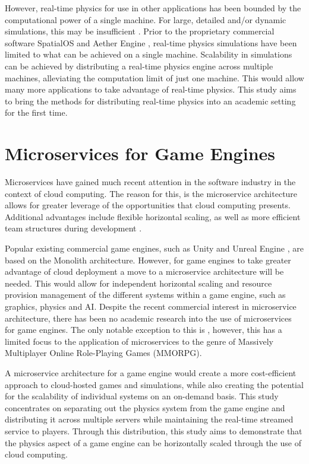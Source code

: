 
However, real-time physics for use in other applications has been bounded by the computational power of a single machine. For large, detailed and/or dynamic simulations, this may be insufficient \cite{koszela2018distributed}. Prior to the proprietary commercial software SpatialOS \cite{SpatialOS} and Aether Engine \cite{AetherEngine}, real-time physics simulations have been limited to what can be achieved on a single machine. Scalability in simulations can be achieved by distributing a real-time physics engine across multiple machines, alleviating the computation limit of just one machine. This would allow many more applications to take advantage of real-time physics. This study aims to bring the methods for distributing real-time physics into an academic setting for the first time.

\section{Microservices for Game Engines}
Microservices have gained much recent attention in the software industry in the context of cloud computing. The reason for this, is the microservice architecture allows for greater leverage of the opportunities that cloud computing presents. Additional advantages include flexible horizontal scaling, as well as more efficient team structures during development \cite{2017ExtractionofMicroservices}.

Popular existing commercial game engines, such as Unity \cite{Unity} and Unreal Engine \cite{Unreal}, are based on the Monolith architecture. However, for game engines to take greater advantage of cloud deployment a move to a microservice architecture will be needed. This would allow for independent horizontal scaling and resource provision management of the different systems within a game engine, such as graphics, physics and AI. Despite the recent commercial interest in microservice architecture, there has been no academic research into the use of microservices for game engines. The only notable exception to this is \cite{vaha2017applying}, however, this has a limited focus to the application of microservices to the genre of Massively Multiplayer Online Role-Playing Games (MMORPG).

A microservice architecture for a game engine would create a more cost-efficient approach to cloud-hosted games and simulations, while also creating the potential for the scalability of individual systems on an on-demand basis. This study concentrates on separating out the physics system from the game engine and distributing it across multiple servers while maintaining the real-time streamed service to players. Through this distribution, this study aims to demonstrate that the physics aspect of a game engine can be horizontally scaled through the use of cloud computing.

